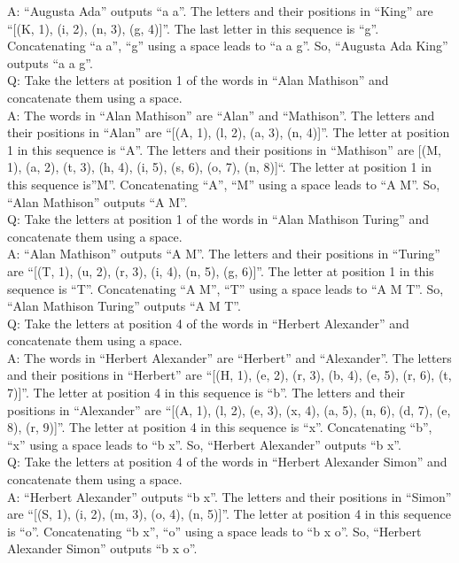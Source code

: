 \documentclass[
]{article}
\begin{document}
A: ``Augusta Ada'' outputs ``a a''. The letters and their positions in
``King'' are ``{[}(K, 1), (i, 2), (n, 3), (g, 4){]}''. The last letter
in this sequence is ``g''. Concatenating ``a a'', ``g'' using a space
leads to ``a a g''. So, ``Augusta Ada King'' outputs ``a a g''.\\
Q: Take the letters at position 1 of the words in ``Alan Mathison'' and
concatenate them using a space.\\
A: The words in ``Alan Mathison'' are ``Alan'' and ``Mathison''. The
letters and their positions in ``Alan'' are ``{[}(A, 1), (l, 2), (a, 3),
(n, 4){]}''. The letter at position 1 in this sequence is ``A''. The
letters and their positions in ``Mathison'' are {[}(M, 1), (a, 2), (t,
3), (h, 4), (i, 5), (s, 6), (o, 7), (n, 8){]}``. The letter at position
1 in this sequence is''M''. Concatenating ``A'', ``M'' using a space
leads to ``A M''. So, ``Alan Mathison'' outputs ``A M''.\\
Q: Take the letters at position 1 of the words in ``Alan Mathison
Turing'' and concatenate them using a space.\\
A: ``Alan Mathison'' outputs ``A M''. The letters and their positions in
``Turing'' are ``{[}(T, 1), (u, 2), (r, 3), (i, 4), (n, 5), (g, 6){]}''.
The letter at position 1 in this sequence is ``T''. Concatenating ``A
M'', ``T'' using a space leads to ``A M T''. So, ``Alan Mathison
Turing'' outputs ``A M T''.\\
Q: Take the letters at position 4 of the words in ``Herbert Alexander''
and concatenate them using a space.\\
A: The words in ``Herbert Alexander'' are ``Herbert'' and ``Alexander''.
The letters and their positions in ``Herbert'' are ``{[}(H, 1), (e, 2),
(r, 3), (b, 4), (e, 5), (r, 6), (t, 7){]}''. The letter at position 4 in
this sequence is ``b''. The letters and their positions in ``Alexander''
are ``{[}(A, 1), (l, 2), (e, 3), (x, 4), (a, 5), (n, 6), (d, 7), (e, 8),
(r, 9){]}''. The letter at position 4 in this sequence is ``x''.
Concatenating ``b'', ``x'' using a space leads to ``b x''. So, ``Herbert
Alexander'' outputs ``b x''.\\
Q: Take the letters at position 4 of the words in ``Herbert Alexander
Simon'' and concatenate them using a space.\\
A: ``Herbert Alexander'' outputs ``b x''. The letters and their
positions in ``Simon'' are ``{[}(S, 1), (i, 2), (m, 3), (o, 4), (n,
5){]}''. The letter at position 4 in this sequence is ``o''.
Concatenating ``b x'', ``o'' using a space leads to ``b x o''. So,
``Herbert Alexander Simon'' outputs ``b x o''.
\end{document}
